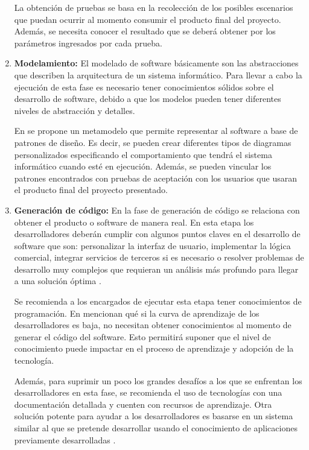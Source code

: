\begin{enumerate}
	La obtención de pruebas se basa en la recolección de los posibles escenarios que puedan ocurrir al momento consumir el producto final del proyecto. Además, se necesita conocer el resultado que se deberá obtener por los parámetros ingresados por cada prueba. 
	
	\item \textbf{Modelamiento: } El modelado de software básicamente son las abstracciones que describen la arquitectura de un sistema informático. Para llevar a cabo la ejecución de esta fase es necesario tener conocimientos sólidos sobre el desarrollo de software, debido a que los modelos pueden tener diferentes niveles de abstracción y detalles.
	
	  En \cite{Kudo} se propone un metamodelo que permite representar al software a base de patrones de diseño. Es decir, se pueden crear diferentes tipos de diagramas personalizados especificando el comportamiento que tendrá el sistema informático cuando esté en ejecución. Además, se pueden vincular los patrones encontrados con pruebas de aceptación con los usuarios que usaran el producto final del proyecto presentado.
	
	\item \textbf{Generación de código:} En la fase de generación de código se relaciona con obtener el producto o software de manera real. En esta etapa los desarrolladores deberán cumplir con algunos puntos claves en el desarrollo de software que son: personalizar la interfaz de usuario, implementar la lógica comercial, integrar servicios de terceros si es necesario o resolver problemas de desarrollo muy complejos que requieran un análisis más profundo para llegar a una solución óptima \cite{Rokis2022}.
	
	Se recomienda a los encargados de ejecutar esta etapa tener conocimientos de programación. En \cite{Rokis2022} mencionan qué si la curva de aprendizaje de los desarrolladores es baja, no necesitan obtener conocimientos al momento de generar el código del software. Esto permitirá suponer que el nivel de conocimiento puede impactar en el proceso de aprendizaje y adopción de la tecnología.
	
	Además, para suprimir un poco los grandes desafíos a los que se enfrentan los desarrolladores en esta fase, se recomienda el uso de tecnologías con una documentación detallada y cuenten con recursos de aprendizaje. Otra solución potente para ayudar a los desarrolladores es basarse en un sistema similar al que se pretende desarrollar usando el conocimiento de aplicaciones previamente desarrolladas \cite{Rokis2022}.  
	

\end{enumerate}
